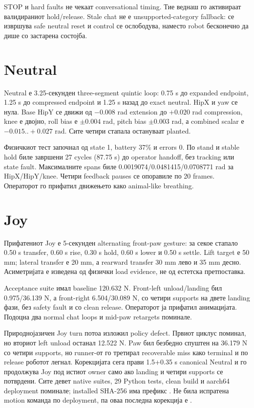 STOP и hard faults не чекаат conversational timing. Тие веднаш го активираат
валидираниот hold/release. Stale chat не е unsupported-category fallback: се
извршува safe neutral reset и control се ослободува, наместо robot бесконечно
да дише со застарена состојба.

\section{Neutral}

Neutral е 3.25-секунден three-segment quintic loop: 0.75 s до expanded
endpoint, 1.25 s до compressed endpoint и 1.25 s назад до exact neutral.
HipX и yaw се нула. Base HipY се движи од $-0.008$ rad extension до $+0.020$
rad compression, knee е двојно, roll bias е $\pm0.004$ rad, pitch bias
$\pm0.003$ rad, а combined scalar е $-0.015..+0.027$ rad. Сите четири стапала
остануваат planted.

Физичкиот тест започнал од state 1, battery 37\% и errors 0. По stand и stable
hold биле завршени 27 cycles (87.75 s) до operator handoff, без tracking или
state fault. Максималните spans биле 0.0019074/0.0481415/0.0708771 rad за
HipX/HipY/knee. Четири feedback pauses се опоравиле по 20 frames. Операторот го
прифатил движењето како animal-like breathing.

\section{Joy}

Прифатениот Joy е 5-секунден alternating front-paw gesture: за секое стапало
0.50 s transfer, 0.60 s rise, 0.30 s hold, 0.60 s lower и 0.50 s settle.
Lift target е 50 mm; lateral transfer е 20 mm, а rearward transfer 30 mm лево
и 35 mm десно. Асиметријата е изведена од физички load evidence, не од
естетска претпоставка.

Acceptance suite имал baseline 120.632 N. Front-left unload/landing бил
0.975/36.139 N, а front-right 6.504/30.089 N, со четири supports на двете
landing фази, без safety fault и со clean release. Операторот ја прифатил
анимацијата. Подоцна два normal chat loops и mid-paw retargets поминале.

Природнојазичен Joy turn потоа изложил policy defect. Првиот циклус поминал,
но вториот left unload останал 12.522 N. Paw бил безбедно спуштен на 36.179 N
со четири supports, но runner-от го третирал recoverable miss како terminal и
по release роботот легнал. Корекцијата сега прави 1.5+0.35 s canonical Neutral
и го продолжува Joy под истиот owner само ако landing и четири supports се
потврдени. Сите девет native suites, 29 Python tests, clean build и aarch64
deployment поминале; installed SHA-256 има префикс . Не била
испратена motion команда по deployment, па оваа последна корекција е
.

